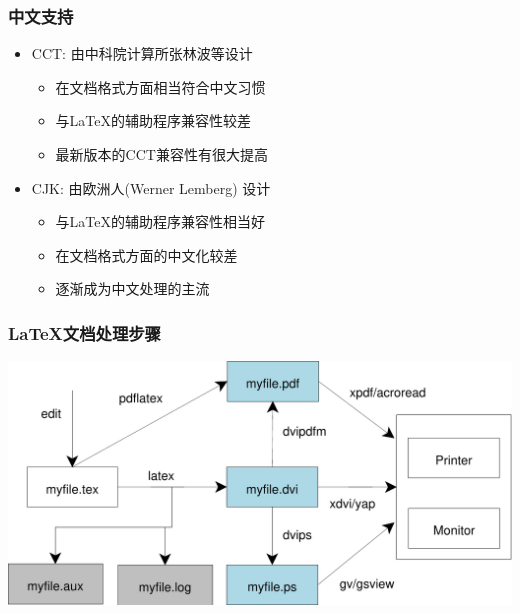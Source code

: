 \documentclass[compress]{beamer}
\begin{document}
\begin{frame}
\frametitle{中文支持}
\begin{itemize}
\item CCT: 由中科院计算所张林波等设计
    \begin{itemize}
     \item 在文档格式方面相当符合中文习惯
     \item 与\LaTeX{}的辅助程序兼容性较差
     \item 最新版本的CCT兼容性有很大提高
    \end{itemize}
\item CJK: 由欧洲人(Werner Lemberg) 设计
    \begin{itemize}
    \item 与\LaTeX 的辅助程序兼容性相当好
    \item 在文档格式方面的中文化较差
    \item 逐渐成为中文处理的主流
    \end{itemize}
\end{itemize}

\end{frame}

\begin{frame}
\frametitle{\LaTeX{}文档处理步骤}

\includegraphics[width=\hsize]{latexprocess.pdf}
\end{frame}
\end{document}
